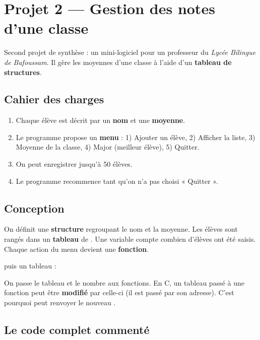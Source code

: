 \section{Projet 2 — Gestion des notes d'une classe}

Second projet de synthèse : un mini-logiciel pour un professeur du \emph{Lycée
Bilingue de Bafoussam}. Il gère les moyennes d'une classe à l'aide d'un
\textbf{tableau de structures}.

\subsection{Cahier des charges}

\begin{enumerate}[label=\arabic*)]
  \item Chaque élève est décrit par un \textbf{nom} et une \textbf{moyenne}.
  \item Le programme propose un \textbf{menu} : 1) Ajouter un élève, 2) Afficher la
        liste, 3) Moyenne de la classe, 4) Major (meilleur élève), 5) Quitter.
  \item On peut enregistrer jusqu'à 50 élèves.
  \item Le programme recommence tant qu'on n'a pas choisi « Quitter ».
\end{enumerate}

\subsection{Conception}

On définit une \textbf{structure}  regroupant le nom et la moyenne.
Les élèves sont rangés dans un \textbf{tableau} de . Une variable
 compte combien d'élèves ont été saisis. Chaque action du menu devient une
\textbf{fonction}.

\begin{syntaxe}
\quad puis un tableau :
\end{syntaxe}

\begin{remarque}
On passe le tableau  et le nombre  aux fonctions. En C, un
tableau passé à une fonction peut être \textbf{modifié} par celle-ci (il est passé
par son adresse). C'est pourquoi  peut renvoyer le nouveau .
\end{remarque}

\subsection{Le code complet commenté}

